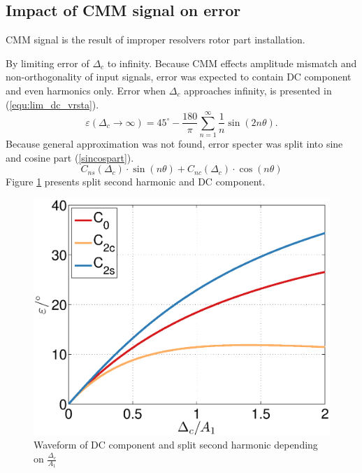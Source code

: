 \documentclass[a4paper]{article}
\begin{document}
\subsection{Impact of CMM signal on error}
CMM signal is the result of  improper resolvers rotor part installation.

By limiting error of $\Delta_c$ to infinity.
Because CMM effects amplitude mismatch and non-orthogonality of input signals, error was expected to contain DC component and even harmonics only.
Error when $\Delta_c$ approaches infinity, is presented in (\ref{equ:lim_dc_vrsta}).
\begin{equation}
\label{equ:lim_dc_vrsta}
\varepsilon(\Delta_c \rightarrow \infty) = 45^\circ -\frac{180}{\pi}\sum_{n=1}^{\infty}\frac{1}{n} \sin( 2 n \theta).
\end{equation}
Because general approximation was not found, error specter was split into sine and cosine part (\ref{sincospart}).
\begin{equation}
\label{sincospart}
C_{ns}(\Delta_c) \cdot\sin(n\theta)+C_{nc}(\Delta_c) \cdot\cos(n\theta)
\end{equation}
Figure \ref{fig:dc} presents split second harmonic and DC component.
\begin{figure}[!htb]
	\begin{center}
		\includegraphics[width=\linewidth]{./Slike/dc.eps}
		\caption{Waveform of DC component and split second harmonic depending on $\frac{\Delta_{c}}{A_1}$} \label{fig:dc}
	\end{center}
\end{figure}
\end{document}
